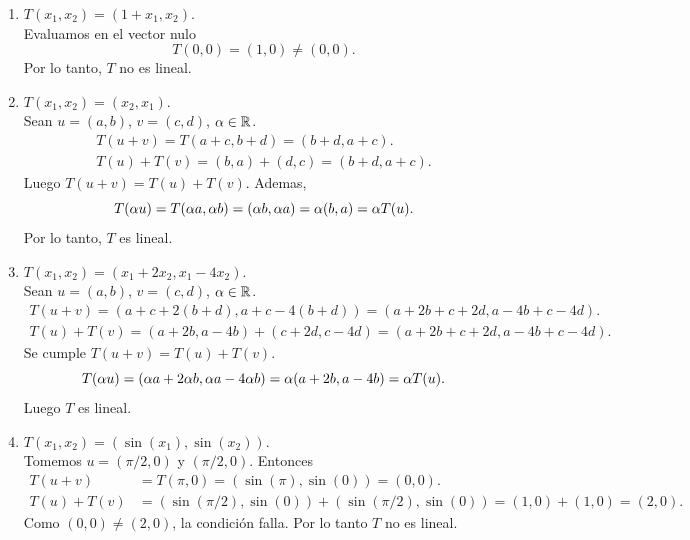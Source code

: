 \documentclass[12pt,a4paper]{article}
\begin{document}
    \begin{solucion}
        \begin{enumerate}
            \item[(a)] $T(x_{1},x_{2})=(1+x_{1},x_{2})$.\\
            Evaluamos en el vector nulo
            \begin{equation*}
                T(0,0)=(1,0)\neq(0,0).
            \end{equation*}
            Por lo tanto, $T$ no es lineal.
            \item[(b)] $T(x_{1},x_{2})=(x_{2},x_{1})$.\\
            Sean $u=(a,b)$, $v=(c,d)$, $\alpha\in\mathbb{R}$.
            \begin{align*}
                T(u+v)=T(a+c,b+d)=(b+d,a+c).\\
                T(u)+T(v)=(b,a)+(d,c)=(b+d,a+c).
            \end{align*}
            Luego $T(u+v)=T(u)+T(v)$. Ademas,
            \begin{equation*}
                T(\alpha u)=T(\alpha a,\alpha b)=(\alpha b,\alpha a)=\alpha(b,a)=\alpha T(u).
            \end{equation*}
            Por lo tanto, $T$ es lineal.
            \item[(c)] $T(x_{1},x_{2})=(x_{1}+2x_{2},x_{1}-4x_{2})$.\\
            Sean $u=(a,b)$, $v=(c,d)$, $\alpha\in\mathbb{R}$.
            \begin{align*}
                T(u+v)=(a+c+2(b+d),a+c-4(b+d))=(a+2b+c+2d,a-4b+c-4d).\\
                T(u)+T(v)=(a+2b,a-4b)+(c+2d,c-4d)=(a+2b+c+2d,a-4b+c-4d).
            \end{align*}
            Se cumple $T(u+v)=T(u)+T(v)$.
            \begin{equation*}
                T(\alpha u)=(\alpha a+2\alpha b,\alpha a-4\alpha b)=\alpha(a+2b,a-4b)=\alpha T(u).
            \end{equation*}
            Luego $T$ es lineal.
            \item[(d)] $T(x_{1},x_{2})=(\sin(x_{1}),\sin(x_{2}))$.\\
            Tomemos $u=(\pi/2,0)$ y $(\pi/2,0)$. Entonces
            \begin{align*}
                T(u+v)&=T(\pi,0)=(\sin(\pi),\sin(0))=(0,0).\\
                T(u)+T(v)&=(\sin(\pi/2),\sin(0))+(\sin(\pi/2),\sin(0))=(1,0)+(1,0)=(2,0).
            \end{align*}
            Como $(0,0)\neq(2,0)$, la condición falla. Por lo tanto $T$ no es lineal.
        \end{enumerate}
    \end{solucion}
\end{document}

